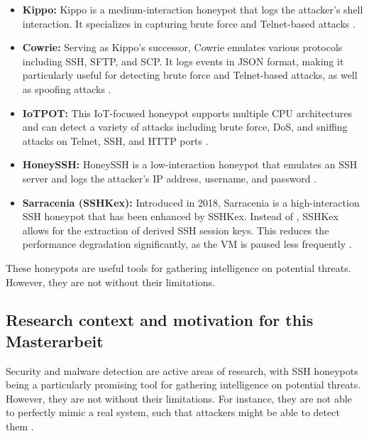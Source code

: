     \begin{itemize}
        \item \textbf{Kippo:} Kippo is a medium-interaction honeypot that logs the attacker's shell interaction. It specializes in capturing brute force and Telnet-based attacks \cite{ClassificationMalware21}.
        
        \item \textbf{Cowrie:} Serving as Kippo's successor, Cowrie emulates various protocols including SSH, SFTP, and SCP. It logs events in JSON format, making it particularly useful for detecting brute force and Telnet-based attacks, as well as spoofing attacks \cite{ClassificationMalware21}.
        
        \item \textbf{IoTPOT:} This IoT-focused honeypot supports multiple CPU architectures and can detect a variety of attacks including brute force, DoS, and sniffing attacks on Telnet, SSH, and HTTP ports \cite{ClassificationMalware21}.
        
        \item \textbf{HoneySSH:} HoneySSH is a low-interaction honeypot that emulates an SSH server and logs the attacker's IP address, username, and password \cite{honeyssh17}.
        
        \item \textbf{Sarracenia (SSHKex):} Introduced in 2018, Sarracenia is a high-interaction SSH honeypot that has been enhanced by SSHKex. Instead of  \cite{SSHkex22}, SSHKex allows for the extraction of derived SSH session keys. This reduces the performance degradation significantly, as the VM is paused less frequently \cite{SSHkex22} \cite{SarraceniaSSHHoneypot18}.
    \end{itemize}

    These honeypots are useful tools for gathering intelligence on potential threats. However, they are not without their limitations.

    \subsection{Research context and motivation for this Masterarbeit}

    Security and malware detection are active areas of research, with SSH honeypots being a particularly promising tool for gathering intelligence on potential threats. However, they are not without their limitations. For instance, they are not able to perfectly mimic a real system, such that attackers might be able to detect them . 
    
